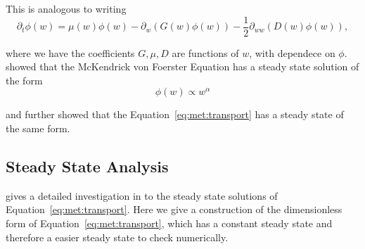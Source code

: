 \documentclass[../main.tex]{subfiles}
\begin{document}
  This is analogous to writing
  \begin{equation}\label{eq:met:transport}
    \partial_t \phi(w) = \mu(w) \phi(w) - \partial_w(G(w) \phi(w)) - \frac{1}{2} \partial_{ww} ( D(w) \phi(w)),
  \end{equation}

  where we have the coefficients $G, \mu, D$ are functions of $w$, with dependece on $\phi$. \cite{benoit2004} showed that the McKendrick von Foerster Equation has a steady state solution of the form
  \begin{equation}
    \phi(w) \propto w^{\alpha}
  \end{equation}

  and further \cite{datta2010} showed that the Equation~\ref{eq:met:transport} has a steady state of the same form.

  \subsection{Steady State Analysis}
  \cite{datta2011} gives a detailed investigation in to the steady state solutions of Equation~\ref{eq:met:transport}. Here we give a construction of the dimensionless form of Equation~\ref{eq:met:transport}, which has a constant steady state and therefore a easier steady state to check numerically. 
\end{document}
